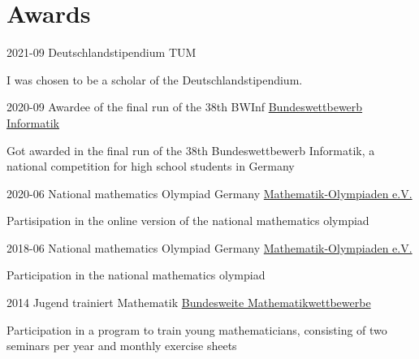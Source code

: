 \documentclass{tccv}
\begin{document}
\section{Awards}

\begin{eventlist}

\item{ 2021-09 }
	{ Deutschlandstipendium }
	{ TUM }

	I was chosen to be a scholar of the Deutschlandstipendium. 

\item{ 2020-09 }
	{ Awardee of the final run of the 38th BWInf }
	{ \href{https://www.heise.de/news/Bundeswettbewerb-Informatik-Die-Sieger-der-38-Ausgabe-stehen-fest-4906184.html}{Bundeswettbewerb Informatik} }

	Got awarded in the final run of the 38th Bundeswettbewerb Informatik, a national competition for high school students in Germany 

\item{ 2020-06 }
	{ National mathematics Olympiad Germany }
	{ \href{https://www.mo2020.de}{Mathematik-Olympiaden e.V.} }

	Partisipation in the online version of the national mathematics olympiad 

\item{ 2018-06 }
	{ National mathematics Olympiad Germany }
	{ \href{https://mo2018.de/teilnehmende}{Mathematik-Olympiaden e.V.} }

	Participation in the national mathematics olympiad 

\item{ 2014 }
	{ Jugend trainiert Mathematik }
	{ \href{https://www.mathe-wettbewerbe.de/jugend-trainiert-mathematik}{Bundesweite Mathematikwettbewerbe} }

	Participation in a program to train young mathematicians, consisting of two seminars per year and monthly exercise sheets 

\end{eventlist}
\end{document}
